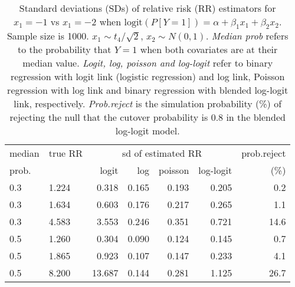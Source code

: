 \documentclass[12pt,a4paper]{article}
\begin{document}
\begin{table}[H] 
\small\sf\centering 
\caption{Standard deviations (SDs) of relative risk (RR) estimators for $x_1=-1$ vs $x_1=-2$ when $\mbox{logit}(P[Y=1])=\alpha+\beta_1 x_1 + \beta_2 x_2$. Sample size is 1000. $x_1 \sim $$t_4/\sqrt{2}$, $x_2 \sim N(0,1)$. {\it Median prob} refers to the probability that $Y=1$ when both covariates are at their median value. {\it Logit, log, poisson and log-logit} refer to binary regression with logit link (logistic regression) and log link, Poisson regression with log link and binary regression with blended log-logit link, respectively. {\it Prob.reject} is the simulation probability (\%) of rejecting the null that the cutover probability is $0.8$ in the blended log-logit model.} 
\begin{tabular}{llrrrrr} 
\toprule 
median & true RR & \multicolumn{4}{c}{sd of estimated RR} & prob.reject \\ 
prob. & & logit & log & poisson & log-logit  & (\%) \\ \midrule 
0.3 & 1.224 &  0.318 & 0.165 & 0.193 & 0.205 &  0.2 \\  
0.3 & 1.634 &  0.603 & 0.176 & 0.217 & 0.265 &  1.1 \\  
0.3 & 4.583 &  3.553 & 0.246 & 0.351 & 0.721 & 14.6 \\  
0.5 & 1.260 &  0.304 & 0.090 & 0.124 & 0.145 &  0.7 \\  
0.5 & 1.865 &  0.923 & 0.107 & 0.147 & 0.233 &  4.1 \\  
0.5 & 8.200 & 13.687 & 0.144 & 0.281 & 1.125 & 26.7 \\  
\bottomrule 
\end{tabular} 
\end{table} 
\end{document}
